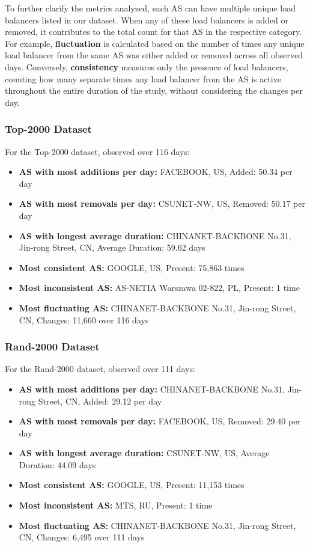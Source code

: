 \documentclass[12pt]{cwru_thesis}
\begin{document}
To further clarify the metrics analyzed, each AS can have multiple unique load balancers listed in our dataset. When any of these load balancers is added or removed, it contributes to the total count for that AS in the respective category. For example, \textbf{fluctuation} is calculated based on the number of times any unique load balancer from the same AS was either added or removed across all observed days. Conversely, \textbf{consistency} measures only the presence of load balancers, counting how many separate times any load balancer from the AS is active throughout the entire duration of the study, without considering the changes per day. 



\subsubsection{Top-2000 Dataset}

For the Top-2000 dataset, observed over 116 days:

\begin{itemize}
    \item \textbf{AS with most additions per day:} FACEBOOK, US, Added: 50.34 per day
    \item \textbf{AS with most removals per day:} CSUNET-NW, US, Removed: 50.17 per day
    \item \textbf{AS with longest average duration:} CHINANET-BACKBONE No.31, Jin-rong Street, CN, Average Duration: 59.62 days
    \item \textbf{Most consistent AS:} GOOGLE, US, Present: 75,863 times
    \item \textbf{Most inconsistent AS:} AS-NETIA Warszawa 02-822, PL, Present: 1 time
    \item \textbf{Most fluctuating AS:} CHINANET-BACKBONE No.31, Jin-rong Street, CN, Changes: 11,660 over 116 days
\end{itemize}

\subsubsection{Rand-2000 Dataset}

For the Rand-2000 dataset, observed over 111 days:

\begin{itemize}
    \item \textbf{AS with most additions per day:} CHINANET-BACKBONE No.31, Jin-rong Street, CN, Added: 29.12 per day
    \item \textbf{AS with most removals per day:} FACEBOOK, US, Removed: 29.40 per day
    \item \textbf{AS with longest average duration:} CSUNET-NW, US, Average Duration: 44.09 days
    \item \textbf{Most consistent AS:} GOOGLE, US, Present: 11,153 times
    \item \textbf{Most inconsistent AS:} MTS, RU, Present: 1 time
    \item \textbf{Most fluctuating AS:} CHINANET-BACKBONE No.31, Jin-rong Street, CN, Changes: 6,495 over 111 days
\end{itemize}
\end{document}
